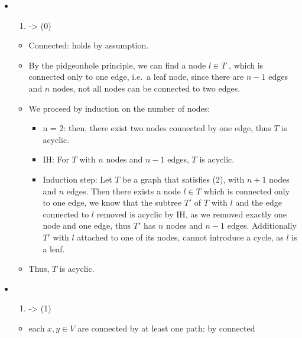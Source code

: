 \documentclass[
]{article}
\providecommand{\tightlist}{%
  \setlength{\itemsep}{0pt}\setlength{\parskip}{0pt}}
\begin{document}
\begin{itemize}
\item
  \begin{enumerate}
  \def\labelenumi{(\arabic{enumi})}
  \setcounter{enumi}{1}
  \tightlist
  \item
    -\textgreater{} (0)
  \end{enumerate}

  \begin{itemize}
  \tightlist
  \item
    Connected: holds by assumption.
  \item
    By the pidgeonhole principle, we can find a node \(l \in T\) , which
    is connected only to one edge, i.e.~a leaf node, since there are
    \(n-1\) edges and \(n\) nodes, not all nodes can be connected to two
    edges.
  \item
    We proceed by induction on the number of nodes:

    \begin{itemize}
    \tightlist
    \item
      n = 2: then, there exist two nodes connected by one edge, thus
      \(T\) is acyclic.
    \item
      IH: For \(T\) with \(n\) nodes and \(n-1\) edges, \(T\) is
      acyclic.
    \item
      Induction step: Let \(T\) be a graph that satisfies (2), with
      \(n+1\) nodes and \(n\) edges. Then there exists a node
      \(l \in T\) which is connected only to one edge, we know that the
      subtree \(T'\) of \(T\) with \(l\) and the edge connected to \(l\)
      removed is acyclic by IH, as we removed exactly one node and one
      edge, thus \(T'\) has \(n\) nodes and \(n-1\) edges. Additionally
      \(T'\) with \(l\) attached to one of its nodes, cannot introduce a
      cycle, as \(l\) is a leaf.
    \end{itemize}
  \item
    Thus, \(T\) is acyclic.
  \end{itemize}
\item
  \begin{enumerate}
  \def\labelenumi{(\arabic{enumi})}
  \setcounter{enumi}{-1}
  \tightlist
  \item
    -\textgreater{} (1)
  \end{enumerate}

  \begin{itemize}
  \tightlist
  \item
    each \(x,y \in V\) are connected by at least one path: by connected


\end{itemize}
\end{itemize}
\end{document}
